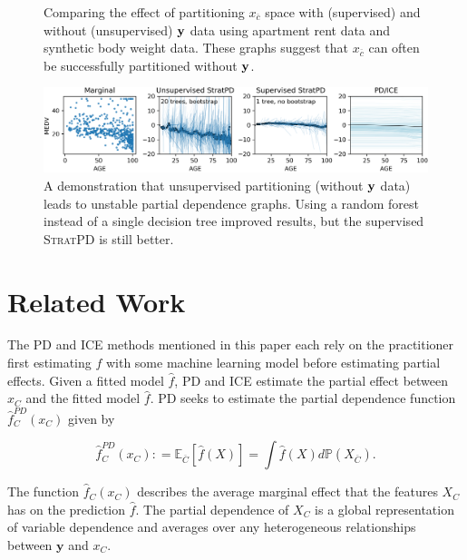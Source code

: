 \documentclass[12pt]{article}
\newcommand{\spd}{\fontfamily{cmr}\textsc{\small StratPD}}
\newcommand{\xnc}{$x_{\overline{c}}$}
\begin{document}
\begin{figure}[htbp]
\begin{center}
\caption{Comparing the effect of partitioning \xnc{} space with (supervised) and without (unsupervised) $\bf y$ data using apartment rent data and synthetic body weight data. These graphs suggest that \xnc{} can often be successfully partitioned without $\bf y$.}
\label{fig:rent_weight_unsup}
\end{center}
\end{figure}

\begin{figure}[htbp]
\begin{center}
\includegraphics[scale=0.7]{images/boston_unsup.png}
\caption{A demonstration that unsupervised partitioning (without $\bf y$ data) leads to unstable partial dependence graphs. Using a random forest instead of a single decision tree improved results, but the supervised \spd{} is still better.}
\label{fig:boston_unsup}
\end{center}
\end{figure}

\section{Related Work}\label{sec:related}

The PD and ICE methods mentioned in this paper each rely on the practitioner first estimating $f$ with some machine learning model before estimating partial effects. Given a fitted model $\widehat{f}$, PD and ICE estimate the partial effect between $x_C$ and the fitted model $\widehat{f}$. PD seeks to estimate the partial dependence function $\widehat{f}^{PD}_C(x_C)$ given by

\begin{equation*}\label{eq:PD} \widehat{f}^{PD}_C(x_C): = \mathbb{E}_{\overline{C}}\left[\widehat{f}({X})\right] = \int \widehat{f}({X}) d\mathbb{P}(X_{\overline{C}}).\end{equation*}

\noindent The function $\widehat{f}_C(x_C)$ describes the average marginal effect that the features $X_C$ has on the prediction $\widehat{f}$. The partial dependence of $X_C$ is a global representation of variable dependence and averages over any heterogeneous relationships between $\mathbf{y}$ and $x_C$. 
\end{document}
